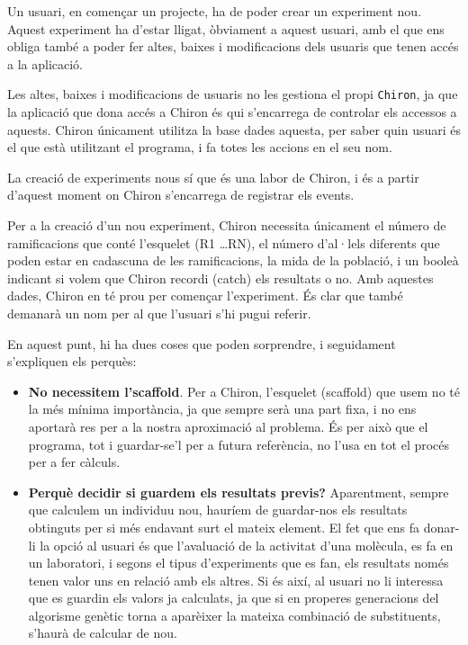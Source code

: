 Un usuari, en començar un projecte, ha de poder crear un experiment nou.  Aquest
experiment ha d'estar lligat, òbviament a aquest usuari, amb el que ens obliga
també a poder fer altes, baixes i modificacions dels usuaris que tenen accés a
la aplicació.

Les altes, baixes i modificacions de usuaris no les gestiona el propi
\texttt{Chiron}, ja que la aplicació que dona accés a Chiron és qui s'encarrega
de controlar els accessos a aquests.  Chiron únicament utilitza la base dades
aquesta, per saber quin usuari és el que està utilitzant el programa, i fa totes
les accions en el seu nom.

La creació de experiments nous sí que és una labor de Chiron, i és a partir
d'aquest moment on Chiron s'encarrega de registrar els events.

Per a la creació d'un nou experiment, Chiron necessita únicament el número de
ramificacions que conté l'esquelet (R1 \dots RN), el número d'al·lels diferents que
poden estar en cadascuna de les ramificacions, la mida de la població, i un booleà
indicant si volem que Chiron recordi (catch) els resultats o no.  Amb aquestes
dades, Chiron en té prou per començar l'experiment.  És clar que també demanarà
un nom per al que l'usuari s'hi pugui referir.

En aquest punt, hi ha dues coses que poden sorprendre, i seguidament s'expliquen
els perquès:

\begin{itemize}
	\item \textbf{No necessitem l'scaffold}. Per a Chiron, l'esquelet (scaffold)
	que usem no té la més mínima importància, ja que sempre serà una part fixa,
	i no ens aportarà res per a la nostra aproximació al problema.  És per això
	que el programa, tot i guardar-se'l per a futura referència, no l'usa en tot
	el procés per a fer càlculs.

	\item \textbf{Perquè decidir si guardem els resultats previs?}
	Aparentment, sempre que calculem un individuu nou, hauríem de guardar-nos
	els resultats obtinguts per si més endavant surt el mateix element.  El fet
	que ens fa donar-li la opció al usuari és que l'avaluació de la activitat
	d'una molècula, es fa en un laboratori, i segons el tipus d'experiments que
	es fan, els resultats només tenen valor uns en relació amb els altres.  Si
	és així, al usuari no li interessa que es guardin els valors ja calculats,
	ja que si en properes generacions del algorisme genètic torna a aparèixer la
	mateixa combinació de substituents, s'haurà de calcular de nou.
\end{itemize}

